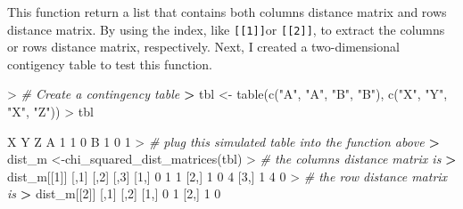 \documentclass[
]{article}
\newenvironment{Shaded}{\begin{snugshade}}{\end{snugshade}}
\newcommand{\CommentTok}[1]{\textcolor[rgb]{0.56,0.35,0.01}{\textit{#1}}}
\newcommand{\DecValTok}[1]{\textcolor[rgb]{0.00,0.00,0.81}{#1}}
\newcommand{\ErrorTok}[1]{\textcolor[rgb]{0.64,0.00,0.00}{\textbf{#1}}}
\newcommand{\FunctionTok}[1]{\textcolor[rgb]{0.00,0.00,0.00}{#1}}
\newcommand{\NormalTok}[1]{#1}
\newcommand{\OtherTok}[1]{\textcolor[rgb]{0.56,0.35,0.01}{#1}}
\newcommand{\SpecialCharTok}[1]{\textcolor[rgb]{0.00,0.00,0.00}{#1}}
\newcommand{\StringTok}[1]{\textcolor[rgb]{0.31,0.60,0.02}{#1}}
\begin{document}
This function return a list that contains both columns distance matrix
and rows distance matrix. By using the index, like
\texttt{{[}{[}1{]}{]}}or \texttt{{[}{[}2{]}{]}}, to extract the columns
or rows distance matrix, respectively. Next, I created a two-dimensional
contigency table to test this function.

\begin{Shaded}
\begin{Highlighting}[]
\SpecialCharTok{\textgreater{}} \CommentTok{\# Create a contingency table}
\ErrorTok{\textgreater{}}\NormalTok{ tbl }\OtherTok{\textless{}{-}} \FunctionTok{table}\NormalTok{(}\FunctionTok{c}\NormalTok{(}\StringTok{"A"}\NormalTok{, }\StringTok{"A"}\NormalTok{, }\StringTok{"B"}\NormalTok{, }\StringTok{"B"}\NormalTok{), }\FunctionTok{c}\NormalTok{(}\StringTok{"X"}\NormalTok{, }\StringTok{"Y"}\NormalTok{, }\StringTok{"X"}\NormalTok{, }\StringTok{"Z"}\NormalTok{))}
\SpecialCharTok{\textgreater{}}\NormalTok{ tbl}
   
\NormalTok{    X Y Z}
\NormalTok{  A }\DecValTok{1} \DecValTok{1} \DecValTok{0}
\NormalTok{  B }\DecValTok{1} \DecValTok{0} \DecValTok{1}
\SpecialCharTok{\textgreater{}} \CommentTok{\# plug this simulated table into the function above}
\ErrorTok{\textgreater{}}\NormalTok{ dist\_m }\OtherTok{\textless{}{-}}\FunctionTok{chi\_squared\_dist\_matrices}\NormalTok{(tbl)}
\SpecialCharTok{\textgreater{}} \CommentTok{\# the columns distance matrix is}
\ErrorTok{\textgreater{}}\NormalTok{ dist\_m[[}\DecValTok{1}\NormalTok{]]}
\NormalTok{     [,}\DecValTok{1}\NormalTok{] [,}\DecValTok{2}\NormalTok{] [,}\DecValTok{3}\NormalTok{]}
\NormalTok{[}\DecValTok{1}\NormalTok{,]    }\DecValTok{0}    \DecValTok{1}    \DecValTok{1}
\NormalTok{[}\DecValTok{2}\NormalTok{,]    }\DecValTok{1}    \DecValTok{0}    \DecValTok{4}
\NormalTok{[}\DecValTok{3}\NormalTok{,]    }\DecValTok{1}    \DecValTok{4}    \DecValTok{0}
\SpecialCharTok{\textgreater{}} \CommentTok{\# the row distance matrix is}
\ErrorTok{\textgreater{}}\NormalTok{ dist\_m[[}\DecValTok{2}\NormalTok{]]}
\NormalTok{     [,}\DecValTok{1}\NormalTok{] [,}\DecValTok{2}\NormalTok{]}
\NormalTok{[}\DecValTok{1}\NormalTok{,]    }\DecValTok{0}    \DecValTok{1}
\NormalTok{[}\DecValTok{2}\NormalTok{,]    }\DecValTok{1}    \DecValTok{0}
\end{Highlighting}
\end{Shaded}
\end{document}
